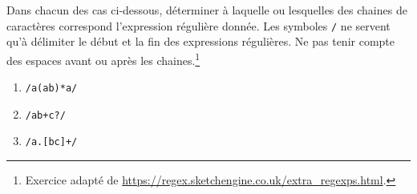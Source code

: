 \begin{exercice}
  Dans chacun des cas ci-dessous, déterminer à laquelle ou lesquelles
  des chaines de caractères correspond l'expression régulière donnée.
  Les symboles \verb=/= ne servent qu'à délimiter le début et la fin
  des expressions régulières. Ne pas tenir compte des espaces avant ou
  après les chaines.\footnote{%
    Exercice adapté de
    \url{https://regex.sketchengine.co.uk/extra_regexps.html}.}
  \begin{enumerate}
    \setlength{\multicolsep}{0pt}
  \item \verb~/a(ab)*a/~
    \begin{enumerate}[1)]
    \end{enumerate}
  \item \verb~/ab+c?/~
    \begin{enumerate}[1)]
    \end{enumerate}
  \item \verb~/a.[bc]+/~
    \begin{enumerate}[1)]
\end{enumerate}
\end{enumerate}
\end{exercice}
